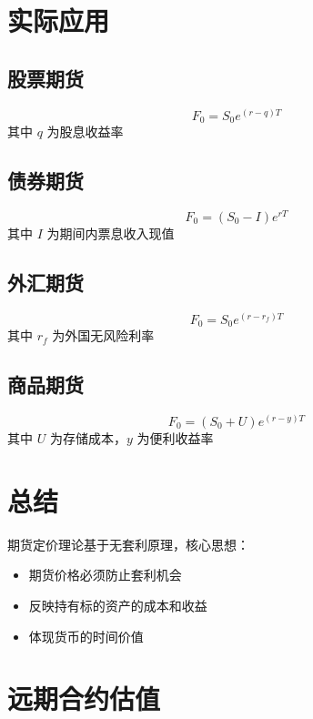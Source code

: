 \section{实际应用}

\subsection{股票期货}
\begin{equation}
F_0 = S_0 e^{(r-q)T}
\end{equation}
其中 $q$ 为股息收益率

\subsection{债券期货}
\begin{equation}
F_0 = (S_0 - I)e^{rT}
\end{equation}
其中 $I$ 为期间内票息收入现值

\subsection{外汇期货}
\begin{equation}
F_0 = S_0 e^{(r-r_f)T}
\end{equation}
其中 $r_f$ 为外国无风险利率

\subsection{商品期货}
\begin{equation}
F_0 = (S_0 + U)e^{(r-y)T}
\end{equation}
其中 $U$ 为存储成本，$y$ 为便利收益率

\section{总结}

期货定价理论基于无套利原理，核心思想：
\begin{itemize}
\item 期货价格必须防止套利机会
\item 反映持有标的资产的成本和收益
\item 体现货币的时间价值
\end{itemize}

\section{远期合约估值}

